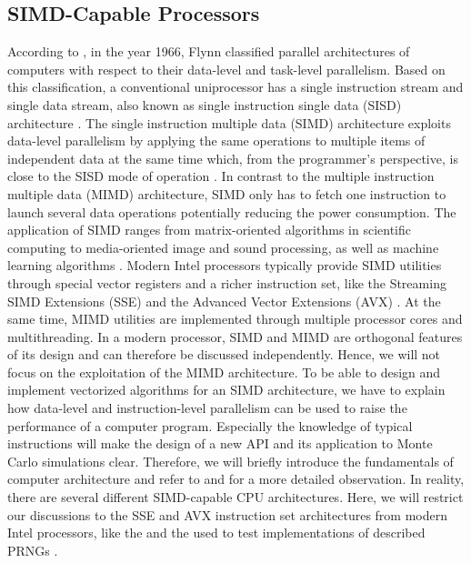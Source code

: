 \documentclass{stdlocal}
\begin{document}
\subsection{SIMD-Capable Processors} %
\label{sub:simd-capable_processors}

  According to \textcite[\ppno~10-11]{hennessy2019}, in the year 1966, Flynn classified parallel architectures of computers with respect to their data-level and task-level parallelism.
  Based on this classification, a conventional uniprocessor has a single instruction stream and single data stream, also known as single instruction single data (SISD) architecture \autocite[\ppno~509-510]{patterson2014}.
  The single instruction multiple data (SIMD) architecture exploits data-level parallelism by applying the same operations to multiple items of independent data at the same time \autocite{hennessy2019} which, from the programmer's perspective, is close to the SISD mode of operation \autocite{patterson2014}.
  In contrast to the multiple instruction multiple data (MIMD) architecture, SIMD only has to fetch one instruction to launch several data operations potentially reducing the power consumption.
  The application of SIMD ranges from matrix-oriented algorithms in scientific computing to media-oriented image and sound processing, as well as machine learning algorithms \autocite[\ppno~10-11]{hennessy2019}.
  Modern Intel processors typically provide SIMD utilities through special vector registers and a richer instruction set, like the Streaming SIMD Extensions (SSE) and the Advanced Vector Extensions (AVX) \autocite{intel-intrinsics-guide,fog2019a,fog2019b,fog2019c,fog2019d,fog2019e}.
  At the same time, MIMD utilities are implemented through multiple processor cores and multithreading.
  In a modern processor, SIMD and MIMD are orthogonal features of its design and can therefore be discussed independently.
  Hence, we will not focus on the exploitation of the MIMD architecture.
  To be able to design and implement vectorized algorithms for an SIMD architecture, we have to explain how data-level and instruction-level parallelism can be used to raise the performance of a computer program.
  Especially the knowledge of typical instructions will make the design of a new API and its application to Monte Carlo simulations clear.
  Therefore, we will briefly introduce the fundamentals of computer architecture and refer to \textcite{patterson2014} and \textcite{hennessy2019} for a more detailed observation.
  In reality, there are several different SIMD-capable CPU architectures.
  Here, we will restrict our discussions to the SSE and AVX instruction set architectures from modern Intel processors, like the  and the  used to test implementations of described PRNGs \autocite{intel-kaby-lake-i5,intel-kaby-lake-i7}.
\end{document}
